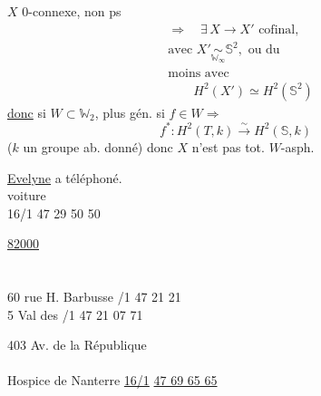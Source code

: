 

$X$ 0-connexe, non ps 
\[
 \begin{aligned}
 &\Rightarrow\quad\exists\, X\longrightarrow X'\text{ cofinal,}\\
 &\text{avec }X'\mathrel{\underset{\mathbb W_\infty}{\sim}}\mathbb S^2,\text{ ou du}\\
 &\text{moins avec}\\
 &\qquad H^2(X')\simeq H^2(\mathbb S^2)
 \end{aligned}
\]
\uline{donc} si $W\subset\mathbb W_2$, plus gén. si  $f\in W\Rightarrow$
\[
 f^*\colon H^2(T,k)\xrightarrow{\sim}H^2(\mathbb S,k)
\]
($k$ un groupe ab. donné) donc $X$ n'est pas tot. $W$-asph.

\uline{Evelyne} a téléphoné.\\
 voiture\\
16/1 47 29 50 50

\uline{82000}\\
\\
\\
60 rue H. Barbusse /1 47 21  21\\
5 Val des  /1 47 21 07 71

403 Av. de la République\\
\\
Hospice de Nanterre \quad \uline{16/1} \uline{47 69 65 65}

